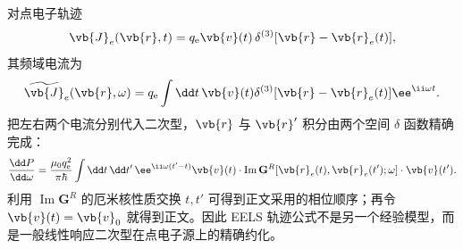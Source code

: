 \begin{derivation}[诱导场做功与电子能量损失谱]
对点电子轨迹
\begin{equation*}
\vb{J}_e(\vb{r},t)
=q_{\mathrm e}\vb{v}(t)\,
\delta^{(3)}[\vb{r}-\vb{r}_e(t)],
\end{equation*}
其频域电流为
\begin{equation*}
\widetilde{\vb{J}}_e(\vb{r},\omega)
=q_{\mathrm e}\int\dd t\,\vb{v}(t)
\delta^{(3)}[\vb{r}-\vb{r}_e(t)]
\ee^{\ii\omega t}.
\end{equation*}
把左右两个电流分别代入二次型，\(\vb{r}\) 与 \(\vb{r}'\) 积分由两个空间 \(\delta\) 函数精确完成：
\begin{equation*}
\frac{\dd P}{\dd\omega}
=\frac{\mu_0q_{\mathrm e}^2}{\pi\hbar}
\int\dd t\,\dd t'\,
\ee^{\ii\omega(t'-t)}
\vb{v}(t)\cdot
\operatorname{Im}\mathbf G^R[\vb{r}_e(t),\vb{r}_e(t');\omega]
\cdot\vb{v}(t').
\end{equation*}
利用 \(\operatorname{Im}\mathbf G^R\) 的厄米核性质交换 \(t,t'\) 可得到正文采用的相位顺序；再令 \(\vb{v}(t)=\vb{v}_0\) 就得到正文。因此 EELS 轨迹公式不是另一个经验模型，而是一般线性响应二次型在点电子源上的精确约化。
\end{derivation}
